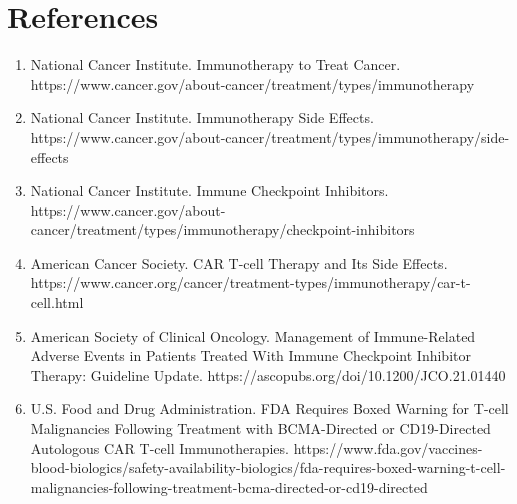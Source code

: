 \section*{References}
\begin{enumerate}
  \item National Cancer Institute. Immunotherapy to Treat Cancer. https://www.cancer.gov/about-cancer/treatment/types/immunotherapy
  \item National Cancer Institute. Immunotherapy Side Effects. https://www.cancer.gov/about-cancer/treatment/types/immunotherapy/side-effects
  \item National Cancer Institute. Immune Checkpoint Inhibitors. https://www.cancer.gov/about-cancer/treatment/types/immunotherapy/checkpoint-inhibitors
  \item American Cancer Society. CAR T-cell Therapy and Its Side Effects. https://www.cancer.org/cancer/treatment-types/immunotherapy/car-t-cell.html
  \item American Society of Clinical Oncology. Management of Immune-Related Adverse Events in Patients Treated With Immune Checkpoint Inhibitor Therapy: Guideline Update. https://ascopubs.org/doi/10.1200/JCO.21.01440
  \item U.S. Food and Drug Administration. FDA Requires Boxed Warning for T-cell Malignancies Following Treatment with BCMA-Directed or CD19-Directed Autologous CAR T-cell Immunotherapies. https://www.fda.gov/vaccines-blood-biologics/safety-availability-biologics/fda-requires-boxed-warning-t-cell-malignancies-following-treatment-bcma-directed-or-cd19-directed
\end{enumerate}

\clearpage
